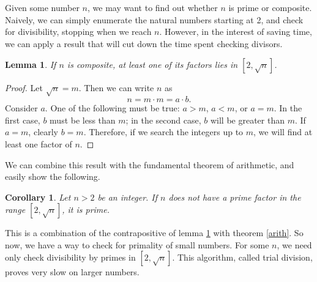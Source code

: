 \documentclass{amsart}
\newtheorem{lem}{Lemma}
\newtheorem{cor}{Corollary}
\theoremstyle{definition}
\theoremstyle{case}
\begin{document}
	Given some number $n$, we may want to find out whether $n$ is prime or composite. Naively, we can simply enumerate the natural numbers starting at 2, and check for divisibility, stopping when we reach $n$. However, in the interest of saving time, we can apply a result that will cut down the time spent checking divisors.
	\begin{lem}\label{sqrt}
		If $n$ is composite, at least one of its factors lies in $[2, \sqrt{n}]$.
	\end{lem}
	\begin{proof}
		Let $\sqrt{n} = m$. Then we can write $n$ as
		$$ n = m \cdot m = a \cdot b . $$
		Consider $a$. One of the following must be true: $a>m$, $a<m$, or $a=m$. In the first case, $b$ must be less than $m$; in the second case, $b$ will be greater than $m$. If $a=m$, clearly $b=m$. Therefore, if we search the integers up to $m$, we will find at least one factor of $n$.
	\end{proof}
	
	We can combine this result with the fundamental theorem of arithmetic, and easily show the following.
	\begin{cor}
		Let $n>2$ be an integer. If $n$ does not have a prime factor in the range $[2, \sqrt{n}]$, it is prime.
	\end{cor}
	This is a combination of the contrapositive of lemma \ref{sqrt} with theorem \ref{arith}. So now, we have a way to check for primality of small numbers. For some $n$, we need only check divisibility by primes in $[2, \sqrt{n}]$. This algorithm, called trial division, proves very slow on larger numbers. 
	
\end{document}

